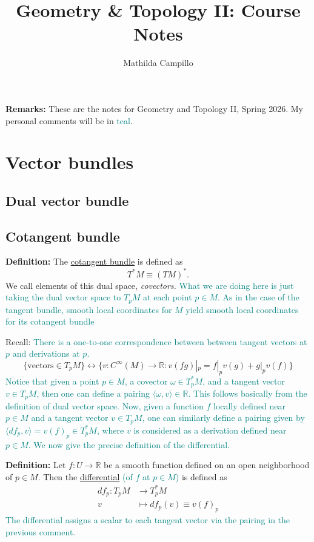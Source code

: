 \documentclass[10.5pt]{article}
\title{Geometry \& Topology II: Course Notes}
\author{Mathilda Campillo}
\newcommand\R{\ensuremath{\mathbb{R}}}
\begin{document}
\maketitle

\textbf{Remarks:} These are the notes for Geometry and Topology II, Spring 2026. My personal comments will be in \textcolor{teal}{teal}.


\tableofcontents

\section{Vector bundles}
\subsection{Dual vector bundle}
\subsection{Cotangent bundle}

\textbf{Definition:} The \underline{cotangent bundle} is defined as
\[T^*M\equiv (TM)^*.\]
We call elements of this dual space, \emph{covectors.} \textcolor{teal}{What we are doing here is just taking the dual vector space to $T_pM$ at each point $p\in M$. As in the case of the tangent bundle, smooth local coordinates for $M$ yield smooth local coordinates for its cotangent bundle}



Recall: \textcolor{teal}{There is a one-to-one correspondence between between tangent vectors at $p$ and derivations at $p$.}
\[\{\text{vectors}\in T_pM\}\longleftrightarrow\{v:C^\infty(M)\to \R:v(fg)|_p=f|_pv(g)+g|_pv(f)\}\]
\textcolor{teal}{Notice that given a point $p\in M$, a covector $\omega\in T^*_pM$, and a tangent vector $v\in T_pM$, then one can define a pairing $\langle \omega, v\rangle\in \R$. This follows basically from the definition of dual vector space.
Now, given a function $f$ locally defined near $p\in M$ and a tangent vector $v\in T_pM$, one can similarly define a pairing given by $\langle df_p,v\rangle =v(f)_p\in T^*_pM$, where $v$ is considered as a derivation defined near $p\in M$. We now give the precise definition of the differential.}


\textbf{Definition:} Let $f:U\to \R$ be a smooth function defined on an open neighborhood of $p\in M$. Then the \underline{differential} \textcolor{teal}{(of $f$ at $p\in M$)} is defined as
\begin{align*}
    df_p:T_pM&\to T^*_pM\\
    v&\mapsto df_p(v)\equiv v(f)_p
\end{align*}
\textcolor{teal}{The differential assigns a scalar to each tangent vector via the pairing in the previous comment.}
\end{document}
